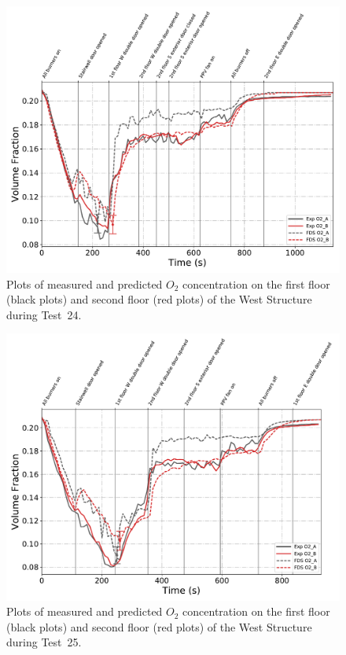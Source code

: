 \begin{figure}[!h]
	\centering
	\includegraphics[width=\columnwidth]{Figures/Plots/Validation/Gas_Concentration/Test_24_O2}
	\caption[Plots of measured and predicted $O_2$ concentration during Test~24.]{Plots of measured and predicted $O_2$ concentration on the first floor (black plots) and second floor (red plots) of the West Structure during Test~24.}
	\label{fig:Test24_O2}
\end{figure}

\begin{figure}[!h]
	\centering
	\includegraphics[width=\columnwidth]{Figures/Plots/Validation/Gas_Concentration/Test_25_O2}
	\caption[Plots of measured and predicted $O_2$ concentration during Test~25.]{Plots of measured and predicted $O_2$ concentration on the first floor (black plots) and second floor (red plots) of the West Structure during Test~25.}
	\label{fig:Test25_O2}
\end{figure}


